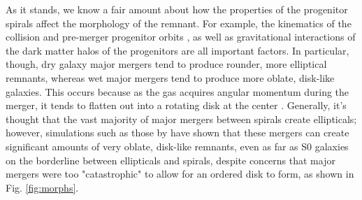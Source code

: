 \documentclass[twocolumn]{aastex631}
\begin{document}
As it stands, we know a fair amount about how the properties of the progenitor spirals affect the morphology of the remnant.
For example, the kinematics of the collision and pre-merger progenitor orbits \citep{Barnes+1992, Duc2013}, as well as gravitational interactions of the dark matter halos of the progenitors \citep{Barnes+1992} are all important factors. 
In particular, though, dry galaxy major mergers tend to produce rounder, more elliptical remnants, whereas wet major mergers tend to produce more oblate, disk-like galaxies.
This occurs because as the gas acquires angular momentum during the merger, it tends to flatten out into a rotating disk at the center \citep{Eliche-Moral+2018}.
Generally, it's thought that the vast majority of major mergers between spirals create ellipticals; however, simulations such as those by \cite{Eliche-Moral+2018} have shown that these mergers can create significant amounts of very oblate, disk-like remnants, even as far as S0 galaxies on the borderline between ellipticals and spirals, despite concerns that major mergers were too "catastrophic" to allow for an ordered disk to form, as shown in Fig. \ref{fig:morphs}.
\end{document}
